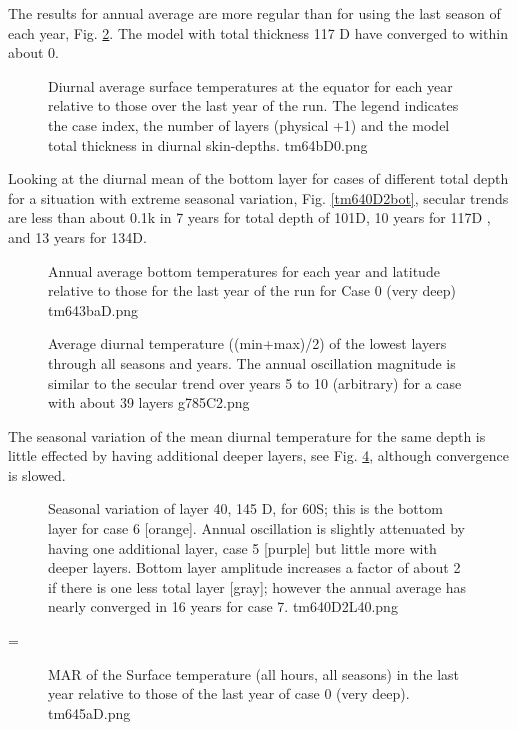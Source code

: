 \documentclass{article}
\begin{document}
 The results for annual average are more regular than for using the last season
 of each year, Fig. \ref{tm643baD}. The model with total thickness 117 D have
 converged to within about 0.

\begin{figure}[!ht] 
\caption[Run D surface]{ Diurnal average surface temperatures at the equator for
  each year relative to those over the last year of the run. The legend
  indicates the case index, the number of layers (physical +1) and the model
  total thickness in diurnal skin-depths.
\label{tm64bD0}  tm64bD0.png }
\end{figure} 

Looking at the diurnal mean of the bottom layer for cases of different total
depth for a situation with extreme seasonal variation, Fig. \ref{tm640D2bot},
secular trends are less than about 0.1k in 7 years for total depth of 101D, 10
years for 117D , and 13 years for 134D.


\begin{figure}[!ht] 
\caption[Run D bottom]{Annual average bottom temperatures for each year and
  latitude relative to those for the last year of the run for Case 0 (very deep)
\label{tm643baD}  tm643baD.png }
\end{figure} 

\begin{figure}[!ht] 
\caption[bottom secular trend]{Average diurnal temperature ((min+max)/2) of the
  lowest layers through all seasons and years. The annual oscillation magnitude
  is similar to the secular trend over years 5 to 10 (arbitrary) for a case with
  about 39 layers
\label{g785C2} g785C2.png }
\end{figure} 

The seasonal variation of the mean diurnal temperature for the same depth is little effected by having additional deeper layers, see Fig. \ref{tm640D2L40}, although convergence is slowed.

\begin{figure}[!ht] 
\caption[Seasonal variation at a fixed depth]{Seasonal variation of layer 40, 145 D, for 60S; this is the bottom layer for case 6 [orange]. Annual oscillation is slightly attenuated by having one additional layer, case 5 [purple] but little more with deeper layers. Bottom layer amplitude increases a factor of about 2 if there is one less total layer [gray]; however the annual average has nearly converged in 16 years for case 7. 
\label{tm640D2L40}  tm640D2L40.png }
\end{figure} 
=
\begin{figure}[!ht] 
\caption[MAR versus case]{MAR of the Surface temperature (all hours, all seasons) in the last year relative to those of the last year of case 0 (very deep).
\label{tm645aD} tm645aD.png  }
\end{figure} 
\end{document}
